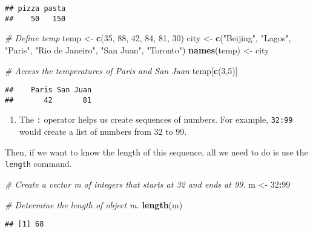 \documentclass[
]{article}
\newenvironment{Shaded}{\begin{snugshade}}{\end{snugshade}}
\newcommand{\CommentTok}[1]{\textcolor[rgb]{0.56,0.35,0.01}{\textit{#1}}}
\newcommand{\DecValTok}[1]{\textcolor[rgb]{0.00,0.00,0.81}{#1}}
\newcommand{\KeywordTok}[1]{\textcolor[rgb]{0.13,0.29,0.53}{\textbf{#1}}}
\newcommand{\NormalTok}[1]{#1}
\newcommand{\OperatorTok}[1]{\textcolor[rgb]{0.81,0.36,0.00}{\textbf{#1}}}
\newcommand{\StringTok}[1]{\textcolor[rgb]{0.31,0.60,0.02}{#1}}
\providecommand{\tightlist}{%
  \setlength{\itemsep}{0pt}\setlength{\parskip}{0pt}}
\begin{document}
\begin{verbatim}
## pizza pasta 
##    50   150
\end{verbatim}

\begin{Shaded}
\begin{Highlighting}[]
\CommentTok{# Define temp}
\NormalTok{temp <-}\StringTok{ }\KeywordTok{c}\NormalTok{(}\DecValTok{35}\NormalTok{, }\DecValTok{88}\NormalTok{, }\DecValTok{42}\NormalTok{, }\DecValTok{84}\NormalTok{, }\DecValTok{81}\NormalTok{, }\DecValTok{30}\NormalTok{)}
\NormalTok{city <-}\StringTok{ }\KeywordTok{c}\NormalTok{(}\StringTok{"Beijing"}\NormalTok{, }\StringTok{"Lagos"}\NormalTok{, }\StringTok{"Paris"}\NormalTok{, }\StringTok{"Rio de Janeiro"}\NormalTok{, }\StringTok{"San Juan"}\NormalTok{, }\StringTok{"Toronto"}\NormalTok{)}
\KeywordTok{names}\NormalTok{(temp) <-}\StringTok{ }\NormalTok{city}

\CommentTok{# Access the temperatures of Paris and San Juan}
\NormalTok{temp[}\KeywordTok{c}\NormalTok{(}\DecValTok{3}\NormalTok{,}\DecValTok{5}\NormalTok{)]}
\end{Highlighting}
\end{Shaded}

\begin{verbatim}
##    Paris San Juan 
##       42       81
\end{verbatim}

\begin{enumerate}
\def\labelenumi{\arabic{enumi}.}
\setcounter{enumi}{5}
\tightlist
\item
  The \texttt{:} operator helps us create sequences of numbers. For
  example, \texttt{32:99} would create a list of numbers from 32 to 99.
\end{enumerate}

Then, if we want to know the length of this sequence, all we need to do
is use the \texttt{length} command.

\begin{Shaded}
\begin{Highlighting}[]
\CommentTok{# Create a vector m of integers that starts at 32 and ends at 99.}
\NormalTok{m <-}\StringTok{ }\DecValTok{32}\OperatorTok{:}\DecValTok{99}

\CommentTok{# Determine the length of object m.}
\KeywordTok{length}\NormalTok{(m)}
\end{Highlighting}
\end{Shaded}

\begin{verbatim}
## [1] 68
\end{verbatim}
\end{document}
